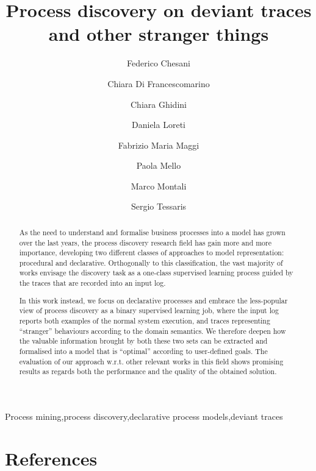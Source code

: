 \documentclass[review]{elsarticle}
\theoremstyle{definition}
\begin{document}
\begin{frontmatter}

\title{Process discovery on deviant traces and other stranger things}

\author[disi]{Federico Chesani}
\author[fbk]{Chiara Di Francescomarino}
\author[fbk]{Chiara Ghidini}
\author[disi]{Daniela Loreti}

\author[unibz]{Fabrizio Maria Maggi}
\author[disi]{Paola Mello}
\author[unibz]{Marco Montali}
\author[unibz]{Sergio Tessaris}

\address[disi]{DISI - University of Bologna, Italy}
\address[fbk]{Fondazione Bruno Kessler, Trento, Italy}
\address[unibz]{Free University of Bozen/Bolzano, Italy}




\begin{abstract}
As the need to understand and formalise business processes into a model has grown over the last years, 
the process discovery research field has gain more and more importance, developing two different classes of approaches to model representation: procedural and declarative. 
%
Orthogonally to this classification, the vast majority of works envisage the discovery task as a one-class supervised learning process guided by the traces that are recorded into an input log. 

In this work instead, we focus on declarative processes and embrace the less-popular view of process discovery as a binary supervised learning job, where the input log reports both examples of the normal system execution, and traces representing ``stranger'' behaviours according to the domain semantics. We therefore deepen how the valuable information brought by both these two sets can be extracted and formalised into a model that is ``optimal'' according to user-defined goals. The evaluation of our approach w.r.t. other relevant works in this field shows promising results as regards both the performance and the quality of the obtained solution.
\end{abstract}

\begin{keyword}
Process mining\sep process discovery\sep declarative process models\sep deviant traces
\end{keyword}

\end{frontmatter}

\linenumbers


%




%




\section*{References}



\end{document}
